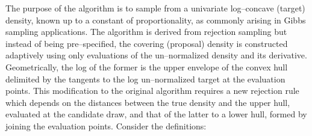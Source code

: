 \documentclass[11pt]{article}
\begin{document}
The purpose of the algorithm is to sample from a univariate log--concave (target) density, known up to a constant of proportionality, as commonly arising in Gibbs sampling applications\cite{gilks1992}\cite{wild1993}. The algorithm is derived from rejection sampling but instead of being pre--specified, the covering (proposal) density is constructed adaptively using only evaluations of the un--normalized density and its derivative. Geometrically, the log of the former is the upper envelope of the convex hull delimited by the tangents to the log un--normalized target at the evaluation points. This modification to the original algorithm requires a new rejection rule which depends on the distances between the true density and the upper hull, evaluated at the candidate draw, and that of the latter to a lower hull, formed by joining the evaluation points. Consider the definitions:
\end{document}
